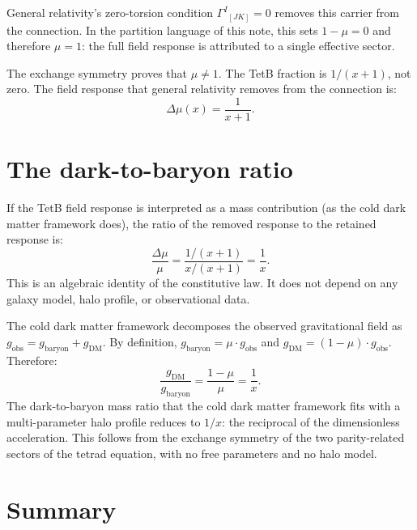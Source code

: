 \documentclass[twocolumn]{iopjournal}
\begin{document}
General relativity's zero-torsion condition
$\Gamma^I{}_{[JK]} = 0$ removes this carrier from the
connection. In the partition language of this note,
this sets $1 - \mu = 0$ and therefore $\mu = 1$: the full
field response is attributed to a single effective sector.

The exchange symmetry proves that $\mu \neq 1$. The TetB
fraction is $1/(x+1)$, not zero. The field response that
general relativity removes from the connection is:
\begin{equation}
  \Delta\mu(x) = \frac{1}{x + 1}.
  \label{eq:delta_mu}
\end{equation}


\section*{The dark-to-baryon ratio}

If the TetB field response is interpreted as a mass
contribution (as the cold dark matter framework does), the
ratio of the removed response to the retained response is:
\begin{equation}
  \frac{\Delta\mu}{\mu}
  = \frac{1/(x+1)}{x/(x+1)}
  = \frac{1}{x}.
  \label{eq:ratio}
\end{equation}
This is an algebraic identity of the constitutive law. It
does not depend on any galaxy model, halo profile, or
observational data.

The cold dark matter framework decomposes the observed
gravitational field as $g_{\mathrm{obs}} = g_{\mathrm{baryon}}
+ g_{\mathrm{DM}}$. By definition,
$g_{\mathrm{baryon}} = \mu \cdot g_{\mathrm{obs}}$ and
$g_{\mathrm{DM}} = (1 - \mu) \cdot g_{\mathrm{obs}}$.
Therefore:
\begin{equation}
  \frac{g_{\mathrm{DM}}}{g_{\mathrm{baryon}}}
  = \frac{1 - \mu}{\mu}
  = \frac{1}{x}.
  \label{eq:cdm_ratio}
\end{equation}
The dark-to-baryon mass ratio that the cold dark matter
framework fits with a multi-parameter halo profile reduces
to $1/x$: the reciprocal of the dimensionless acceleration.
This follows from the exchange symmetry of the two
parity-related sectors of the tetrad equation, with no free
parameters and no halo model.


\section*{Summary}
\end{document}

